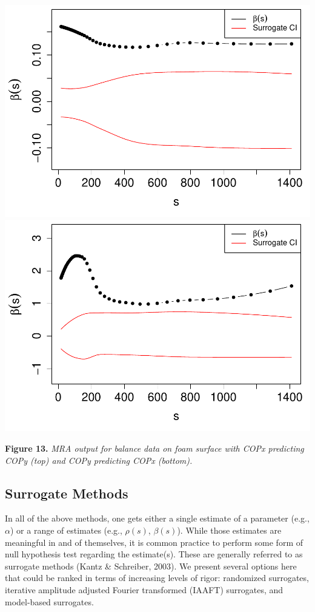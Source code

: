 \documentclass[
  man]{apa6}
\begin{document}
\includegraphics{fractal_regression_paper_brm_files/figure-latex/unnamed-chunk-26-1.pdf} \includegraphics{fractal_regression_paper_brm_files/figure-latex/unnamed-chunk-26-2.pdf}

\textbf{Figure 13.} \emph{MRA output for balance data on foam surface with COPx
predicting COPy (top) and COPy predicting COPx (bottom).}

\hypertarget{surrogate-methods}{%
\subsection{Surrogate Methods}\label{surrogate-methods}}

In all of the above methods, one gets either a single estimate of a
parameter (e.g., \(\alpha\)) or a range of estimates (e.g., \(\rho(s)\),
\(\beta(s)\)). While those estimates are meaningful in and of themselves,
it is common practice to perform some form of null hypothesis test
regarding the estimate(s). These are generally referred to as surrogate
methods (Kantz \& Schreiber, 2003). We present several options here that could be
ranked in terms of increasing levels of rigor: randomized surrogates,
iterative amplitude adjusted Fourier transformed (IAAFT) surrogates, and
model-based surrogates.
\end{document}
